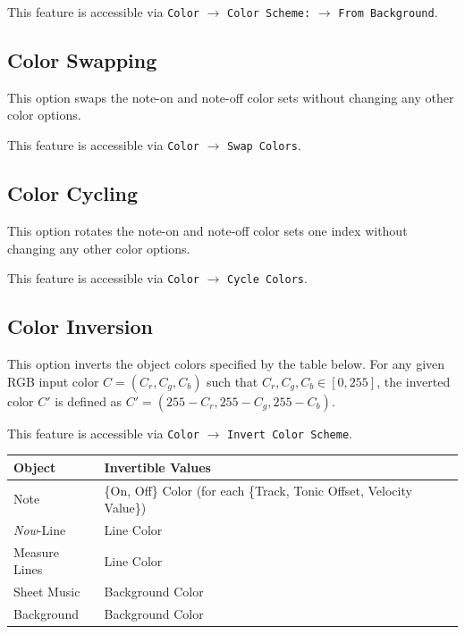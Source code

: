 \documentclass[english]{article}
\makeatletter
\newenvironment{restoretext}%
    {\@parboxrestore%
     \begin{adjustwidth}{}{\leftmargin}%
    }{\end{adjustwidth}
     }
\def\rcbegin{\begin{restoretext}\centering}
\def\rcend{\end{restoretext}}
\providecommand{\mi}[1]{\texttt{#1}}
\makeatother
\begin{document}
This feature is accessible via 
\mi{Color} $\rightarrow$ \mi{Color Scheme:} $\rightarrow$ \mi{From Background}.

\subsection{Color Swapping}

This option swaps the note-on and note-off color sets without changing any other color options.

This feature is accessible via 
\mi{Color} $\rightarrow$ \mi{Swap Colors}.

\subsection{Color Cycling}

This option rotates the note-on and note-off color sets one index without changing any other color options.

This feature is accessible via 
\mi{Color} $\rightarrow$ \mi{Cycle Colors}.

\subsection{Color Inversion}

This option inverts the object colors specified by the table below. For any given RGB input color 
$C= (C_r,C_g,C_b)$ such that $C_r,C_g,C_b \in [0,255]$, the inverted color $C'$ is defined as 
$C' = (255-C_r, 255-C_g, 255-C_b)$.

This feature is accessible via 
\mi{Color} $\rightarrow$ \mi{Invert Color Scheme}.

\vspace{1em}

\rcbegin
\begin{tabular}{|l|l|}
  \hline
  \textbf{Object}         & \textbf{Invertible Values} \\
  \hline
  Note                    & \{On, Off\} Color (for each \{Track, Tonic Offset, Velocity Value\})\\
  \textit{Now}-Line       & Line Color \\
  Measure Lines           & Line Color \\
  Sheet Music             & Background Color \\
  Background              & Background Color \\
  \hline
\end{tabular}
\rcend
\end{document}
